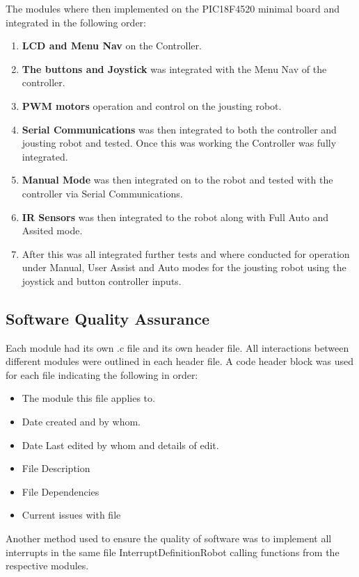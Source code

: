 \documentclass[MTRX3700report.tex]{subfiles}
\begin{document}
The modules where then implemented on the PIC18F4520 minimal board and integrated in the following order:
	\begin{enumerate}
		\item \textbf{LCD and Menu Nav} on the Controller.
		\item \textbf{The buttons and Joystick} was integrated with the Menu Nav of the controller.
		\item \textbf{PWM motors} operation and control on the jousting robot.
		\item \textbf{Serial Communications} was then integrated to both the controller and jousting robot and tested. Once this was working the Controller was fully integrated.
		\item \textbf{Manual Mode} was then integrated on to the robot and tested with the controller via Serial Communications. 
		\item \textbf{IR Sensors} was then integrated to the robot along with Full Auto and Assited mode.
		\item After this was all integrated further tests and where conducted for operation under Manual, User Assist and Auto modes for the jousting robot using the joystick and button controller inputs.	
	\end{enumerate}

\subsection{Software Quality Assurance}
Each module had its own .c file and its own header file. All interactions between different modules were outlined in each header file.
A code header block was used for each file indicating the following in order:

	\begin{itemize}
		\item The module this file applies to.
		\item Date created and by whom.
		\item Date Last edited by whom and details of edit.
		\item File Description
		\item File Dependencies
		\item Current issues with file
	\end{itemize}
	
Another method used to ensure the quality of software was to implement all interrupts in the same file Interrupt\textunderscore Definition\textunderscore Robot calling functions from the respective modules. 
\end{document}
